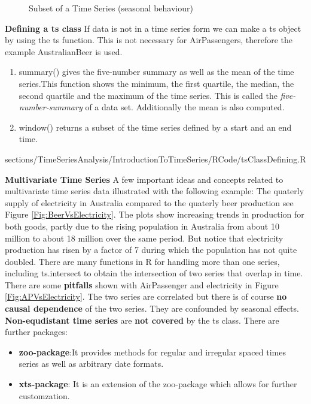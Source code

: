 {{\begin{figure}[H]
	\caption{Subset of a Time Series (seasonal behaviour)}
\end{figure}
\RTheory
{
\textbf{Defining a {\color{blue}ts} class}\vfill
If data is not in a time series form we can make a {\color{blue}ts} object by using the {\color{blue}ts}  function. This is not necessary for AirPassengers, therefore the example AustralianBeer is used.
\begin{enumerate}
	\item  {\color{blue}summary()} gives the five-number summary as well as the mean of the time series.This function shows the minimum, the first quartile, the median, the second quartile and the maximum of the time series. This is called the \textit{five-number-summary} of a data set. Additionally the mean is also computed.
	\item  {\color{blue}window()} returns a subset of the time series defined by a start and an end time.
\end{enumerate}
}
{sections/TimeSeriesAnalysis/IntroductionToTimeSeries/RCode/tsClassDefining.R}
\RTheory
{
\textbf{Multivariate Time Series}\vfill
A few important ideas and concepts related to multivariate time series data illustrated with the following example:\vfill
\hfill
\break
The quaterly supply of electricity in Australia compared to the quaterly beer production see Figure \ref{Fig:BeerVsElectricity}.\vfill
The plots show increasing trends in production for both goods, partly
due to the rising population in Australia from about 10 million to about 18 million over the same period. But notice that electricity production has risen by a factor of 7 during which the population has not quite doubled. \vfill
\hfill
\break
There are many functions in {\color{blue}R} for
handling more than one series, including {\color{blue}ts.intersect} to obtain the intersection
of two series that overlap in time. There are some \textbf{pitfalls} shown with AirPassenger and electricity in Figure \ref{Fig:APVsElectricity}. \vfill
\hfill
\break
The two series are correlated but there is of course \textbf{no causal dependence} of the two series. They are confounded by seasonal effects.
\vfill
\hfill
\break
\textbf{Non-equdistant time series} are \textbf{not covered} by the {\color{blue}ts} class. There are further packages:
\begin{itemize}
	\item \textbf{{\color{blue}zoo-}package}:It provides methods for regular and irregular spaced times series as well as arbitrary date formats.
	\item \textbf{{\color{blue}xts-}package}: It is an extension of the {\color{blue}zoo-}package which allows for further customzation.

\end{itemize}}}}
